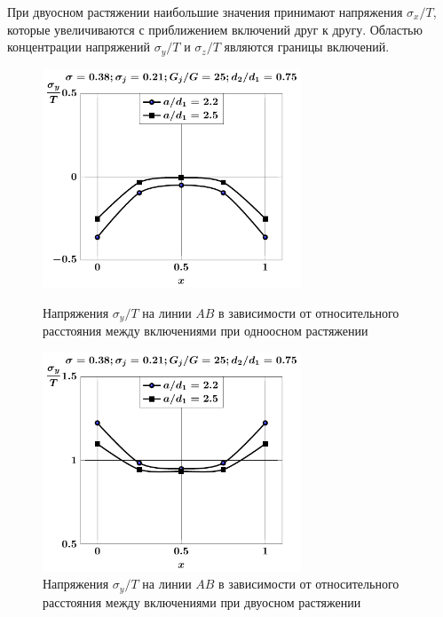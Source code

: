 При двуосном растяжении наибольшие значения принимают напряжения $\sigma_x/T$, которые увеличиваются с приближением включений друг к другу. Областью концентрации напряжений $\sigma_y/T$ и $\sigma_z/T$ являются границы включений.

\begin{figure}[h!]
\centering\footnotesize
\parbox[b]{7.5cm}{\centering\includegraphics[width=7.7cm]{inc13-a-d75-g25-t1-sig_y-ab.pdf}
\caption{Напряжения $\sigma_y/T$ на линии $AB$ в зависимости от относительного расстояния между включениями при одноосном растяжении
\label{f:9:77}}}\hfil\hfil
\parbox[b]{7.5cm}{\centering\includegraphics[width=7.7cm]{inc13-a-d75-g25-t2-sig_y-ab.pdf}
\caption{Напряжения $\sigma_y/T$ на линии $AB$ в зависимости от относительного расстояния между включениями при двуосном растяжении
\label{f:9:78}}}
\end{figure}


